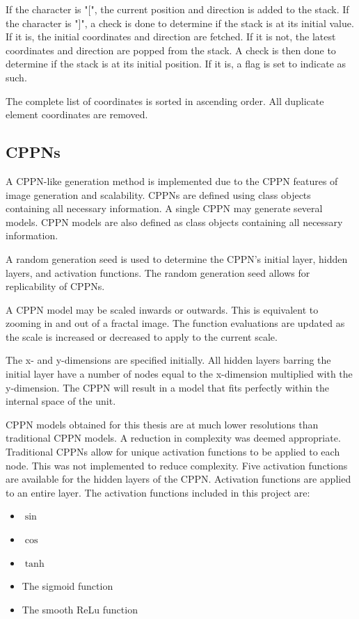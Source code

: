 If the character is "[", the current position and direction is added to the stack. If the character is "]", a check is done to determine if the stack is at its initial value. If it is, the initial coordinates and direction are fetched. If it is not, the latest coordinates and direction are popped from the stack. A check is then done to determine if the stack is at its initial position. If it is, a flag is set to indicate as such.

The complete list of coordinates is sorted in ascending order. All duplicate element coordinates are removed.

\subsection{CPPNs}
\label{ssec:CPPN}

A CPPN-like generation method is implemented due to the CPPN features of image generation and scalability. CPPNs are defined using class objects containing all necessary information. A single CPPN may generate several models. CPPN models are also defined as class objects containing all necessary information.

A random generation seed is used to determine the CPPN's initial layer, hidden layers, and activation functions. The random generation seed allows for replicability of CPPNs.

A CPPN model may be scaled inwards or outwards. This is equivalent to zooming in and out of a fractal image. The function evaluations are updated as the scale is increased or decreased to apply to the current scale.

The x- and y-dimensions are specified initially. All hidden layers barring the initial layer have a number of nodes equal to the x-dimension multiplied with the y-dimension. The CPPN will result in a model that fits perfectly within the internal space of the unit.

CPPN models obtained for this thesis are at much lower resolutions than traditional CPPN models. A reduction in complexity was deemed appropriate. Traditional CPPNs allow for unique activation functions to be applied to each node. This was not implemented to reduce complexity. Five activation functions are available for the hidden layers of the CPPN. Activation functions are applied to an entire layer. The activation functions included in this project are:

\begin{itemize}
	\item $\sin$
	\item $\cos$
	\item $\tanh$
	\item The sigmoid function
	\item The smooth ReLu function
\end{itemize}

